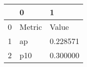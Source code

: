 \begin{tabular}{lll}
\toprule
 & 0 & 1 \\
\midrule
0 & Metric & Value \\
1 & ap & 0.228571 \\
2 & p10 & 0.300000 \\
\bottomrule
\end{tabular}
